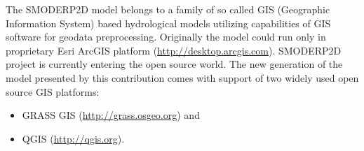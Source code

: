 

\justifying
{\rmfamily The SMODERP2D model belongs to a family of so called GIS
(Geographic Information System) based hydrological models utilizing
capabilities of GIS software for geodata preprocessing. Originally the
model could run only in proprietary Esri ArcGIS platform
(\url{http://desktop.arcgis.com}). SMODERP2D project is currently
entering the open source world. The new generation of the model
presented by this contribution comes with support of two widely used
open source GIS platforms:

\begin{itemize}
\item GRASS GIS (\url{http://grass.osgeo.org}) and
\item QGIS (\url{http://qgis.org}).
\end{itemize}
}

